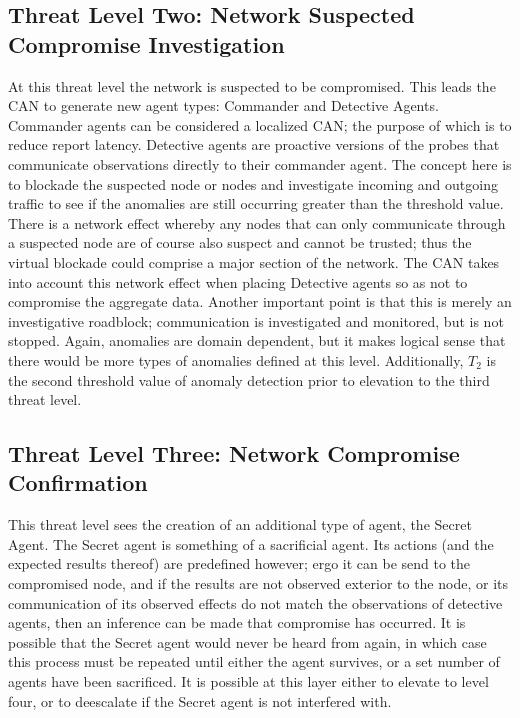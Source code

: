 \documentclass{acm_proc_article-sp}
\begin{document}
\subsection{Threat Level Two: Network Suspected Compromise Investigation}
At this threat level the network is suspected to be compromised.  This leads the CAN to generate new agent types:  Commander and Detective Agents.  Commander agents can be considered a localized CAN; the purpose of which is to reduce report latency.  Detective agents are proactive versions of the probes that communicate observations directly to their commander agent.  The concept here is to blockade the suspected node or nodes and investigate incoming and outgoing traffic to see if the anomalies are still occurring greater than the threshold value.   There is a network effect whereby any nodes that can only communicate through a suspected node are of course also suspect and cannot be trusted; thus the virtual blockade could comprise a major section of the network.  The CAN takes into account this network effect when placing Detective agents so as not to compromise the aggregate data.  Another important point is that this is merely an investigative roadblock; communication is investigated and monitored, but is not stopped.  Again, anomalies are domain dependent, but it makes logical sense that there would be more types of anomalies defined at this level.  Additionally, $T_2$ is the second threshold value of anomaly detection prior to elevation to the third threat level.

\subsection{Threat Level Three: Network Compromise Confirmation}
This threat level sees the creation of an additional type of agent, the Secret Agent.  The Secret agent is something of a sacrificial agent.  Its actions (and the expected results thereof) are predefined however; ergo it can be send to the compromised node, and if the results are not observed exterior to the node, or its communication of its observed effects do not match the observations of detective agents, then an inference can be made that compromise has occurred.  It is possible that the Secret agent would never be heard from again, in which case this process must be repeated until either the agent survives, or a set number of agents have been sacrificed.  It is possible at this layer either to elevate to level four, or to deescalate if the Secret agent is not interfered with.
\end{document}
